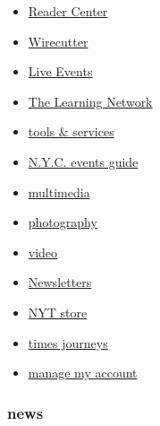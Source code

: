 \begin{itemize}
\tightlist
\item
  \href{https://web.archive.org/web/20200206210009/https://www.nytimes.com/section/reader-center}{Reader
  Center}
\item
  \href{https://web.archive.org/web/20200206210009/https://thewirecutter.com/}{Wirecutter}
\item
  \href{https://web.archive.org/web/20200206210009/http://nytconferences.com/}{Live
  Events}
\item
  \href{https://web.archive.org/web/20200206210009/https://www.nytimes.com/section/learning}{The
  Learning Network}
\item
  \href{https://web.archive.org/web/20200206210009/http://www.nytimes.com/marketing/tools-and-services}{tools
  \& services}
\item
  \href{https://web.archive.org/web/20200206210009/https://www.nytimes.com/spotlight/arts-listings}{N.Y.C.
  events guide}
\item
  \href{https://web.archive.org/web/20200206210009/https://www.nytimes.com/section/multimedia}{multimedia}
\item
  \href{https://web.archive.org/web/20200206210009/https://www.nytimes.com/section/lens}{photography}
\item
  \href{https://web.archive.org/web/20200206210009/https://www.nytimes.com/video}{video}
\item
  \href{https://web.archive.org/web/20200206210009/https://www.nytimes.com/newsletters}{Newsletters}
\item
  \href{https://web.archive.org/web/20200206210009/https://store.nytimes.com/}{NYT
  store}
\item
  \href{https://web.archive.org/web/20200206210009/https://www.nytimes.com/times-journeys}{times
  journeys}
\item
  \href{https://web.archive.org/web/20200206210009/https://account.nytimes.com/}{manage
  my account}
\end{itemize}

\hypertarget{news}{%
\subsubsection{news}\label{news}}

